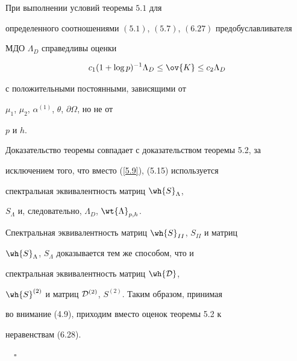 \begin{thms}\label{th6.2} При выполнении условий теоремы $5.1$ для 


определенного соотношениями $(5.1)$, $(5.7)$, $(6.27)$ предобуславливателя 


МДО $\Lambda_D$ справедливы оценки 


\begin{equation}\label{eq28}


c_1(1+ \log p)^{-1} \Lambda_D \leq \ov{K} \leq c_2 \Lambda_D


\end{equation}


с положительными постоянными, зависящими от 


$\mu_1$, $\mu_2$, $\alpha^{(1)}$, $\theta$, $\partial\Omega$, но не от


$p$ и $h$.


\end{thms}





Доказательство теоремы совпадает с доказательством теоремы 5.2, за 


исключением того, что вместо (\ref{5.9}), (5.15) используется 


спектральная эквивалентность матриц $\wh{S}_\Lambda$,


$S_\Lambda$ и, следовательно, $\Lambda_D$, $\wt{\Lambda}_{p,h}$.


Спектральная эквивалентность матриц $\wh{S}_{II}$, ${S}_{II}$ и матриц 


$\wh{S}_\Lambda$, $S_\Lambda$ доказывается тем же способом, что и 


спектральная эквивалентность матриц $\wh{{\cal D}}$,


$\wh{S}^{(2)}$ и матриц ${\cal D}^{(2)}$, $S^{(2)}$. Таким образом, принимая 


во внимание (4.9), приходим вместо оценок теоремы 5.2 к 


неравенствам (6.28). 


$\quad\square$





